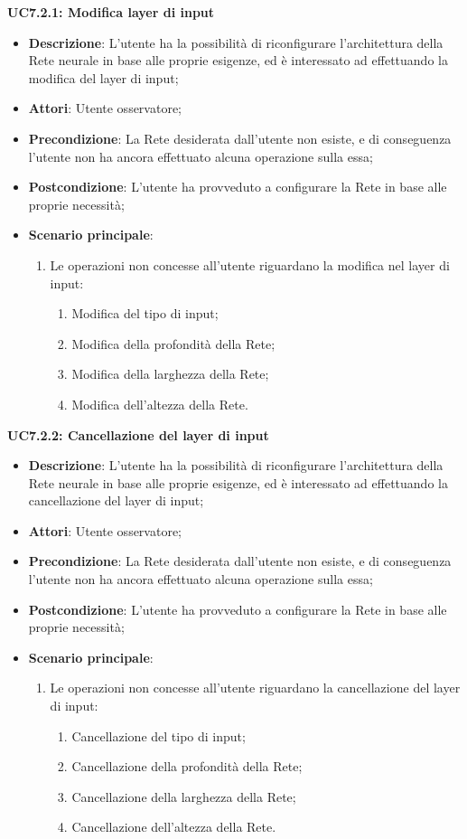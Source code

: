 \textbf{UC7.2.1: Modifica layer di input}
\label{UC7.2.1: Modifica layer di input}
\noindent
\begin{itemize}
\item \textbf{Descrizione}: L'utente ha la possibilit\`a di riconfigurare l'architettura della Rete neurale in base alle proprie esigenze, ed \`e interessato ad effettuando la modifica del layer di input;
\item \textbf{Attori}: Utente osservatore;
\item \textbf{Precondizione}: La Rete desiderata dall'utente non esiste, e di conseguenza l'utente non ha ancora effettuato alcuna operazione sulla essa;
\item \textbf{Postcondizione}: L'utente ha provveduto a configurare la Rete in base alle proprie necessit\`a;
\item \textbf{Scenario principale}:
\begin{enumerate}
\item Le operazioni non concesse all'utente riguardano la modifica nel layer di input:
\begin{enumerate}
\item Modifica del tipo di input;
\item Modifica della profondit\`a della Rete;
\item Modifica della larghezza della Rete;
\item Modifica dell'altezza della Rete.
\end{enumerate}
\end{enumerate}
\end{itemize}

\textbf{UC7.2.2: Cancellazione del layer di input}
\label{UC7.2.2: Cancellazione del layer di input}
\noindent
\begin{itemize}
\item \textbf{Descrizione}: L'utente ha la possibilit\`a di riconfigurare l'architettura della Rete neurale in base alle proprie esigenze, ed \`e interessato ad effettuando la cancellazione del layer di input;
\item \textbf{Attori}: Utente osservatore;
\item \textbf{Precondizione}: La Rete desiderata dall'utente non esiste, e di conseguenza l'utente non ha ancora effettuato alcuna operazione sulla essa;
\item \textbf{Postcondizione}: L'utente ha provveduto a configurare la Rete in base alle proprie necessit\`a;
\item \textbf{Scenario principale}:
\begin{enumerate}
\item Le operazioni non concesse all'utente riguardano la cancellazione del layer di input:
\begin{enumerate}
\item Cancellazione del tipo di input;
\item Cancellazione della profondit\`a della Rete;
\item Cancellazione della larghezza della Rete;
\item Cancellazione dell'altezza della Rete.
\end{enumerate}
\end{enumerate}
\end{itemize}


